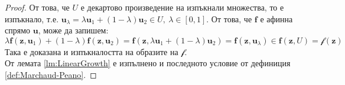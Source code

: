 \begin{proof}
  От това, че $U$ е декартово произведение на изпъкнали множества, то е изпъкнало, т.е. $\mathbf{u}_{\lambda} = \lambda \mathbf{u}_1 + (1-\lambda) \mathbf{u}_2 \in U,~ \lambda \in [0, 1]$.
  От това, че $\mathbf{f}$ е афинна спрямо $\mathbf{u}$, може да запишем:
  \begin{equation*}
    \lambda \mathbf{f}(\mathbf{z}, \mathbf{u}_1) + (1-\lambda)\mathbf{f}(\mathbf{z}, \mathbf{u}_2) = \mathbf{f}(\mathbf{z}, \lambda \mathbf{u}_1 + (1-\lambda)\mathbf{u}_2) = \mathbf{f}(\mathbf{z}, \mathbf{u}_{\lambda}) \in \mathbf{f}(\mathbf{z}, U) = \mathscr{f}(\mathbf{z})
  \end{equation*}
  Така е доказана и изпъкналостта на образите на $\mathscr{f}$. \\
  От лемата \ref{lm:LinearGrowth} е изпълнено и последното условие от дефиниция \ref{def:Marchaud-Peano}.
\end{proof}


